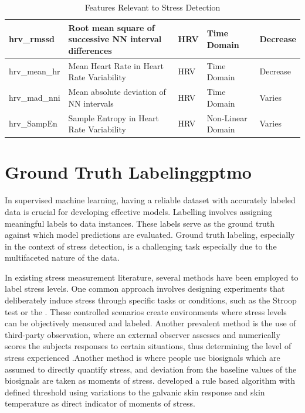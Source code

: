 \begin{table}[!htbp]
{\begin{tabular}{|l|p{4cm}|l|l|l|}
  hrv\_rmssd              & Root mean square of successive NN interval differences        & HRV                   & Time Domain     & Decrease        \\ \hline
  hrv\_mean\_hr            & Mean Heart Rate in Heart Rate Variability                     & HRV                   & Time Domain     & Decrease        \\ \hline
  hrv\_mad\_nni           & Mean absolute deviation of NN intervals                         & HRV                   & Time Domain     & Varies          \\ \hline
  hrv\_SampEn              & Sample Entropy in Heart Rate Variability                      & HRV                   & Non-Linear Domain & Varies          \\ \hline
  \end{tabular}}
  \caption{Features Relevant to Stress Detection}
  \label{tab:stress_features}
\end{table}



\section{Ground Truth Labeling\gls{gptmo}}
In supervised machine learning, having a reliable dataset with accurately labeled data is crucial for developing effective models. Labelling involves assigning meaningful labels to data instances. These labels serve as the ground truth against which model predictions are evaluated. Ground truth labeling, especially in the context of stress detection, is a challenging task especially due to the multifaceted nature of the data.


In existing stress measurement literature, several methods have been employed to label stress levels. One common approach involves designing experiments that deliberately induce stress through specific tasks or conditions, such as the Stroop test\parencite{stroop} or the  \parencites{alsha}{swell}{wesad}{4242}. These controlled scenarios create environments where stress levels can be objectively measured and labeled. Another prevalent method is the use of third-party observation, where an external observer assesses and numerically scores the subjects responses to certain situations, thus determining the level of stress experienced \parencites{Aigrain2016}{Jin_2020}{Siirtola2020-wp}.Another method is where people use biosignals which are assumed to directly quantify stress, and deviation from the baseline values of the biosignals are taken as moments of stress. \textcite{Kyriakou2019-dc} developed a rule based algorithm with defined threshold using variations to the galvanic skin response and skin temperature as direct indicator of moments of stress. 


